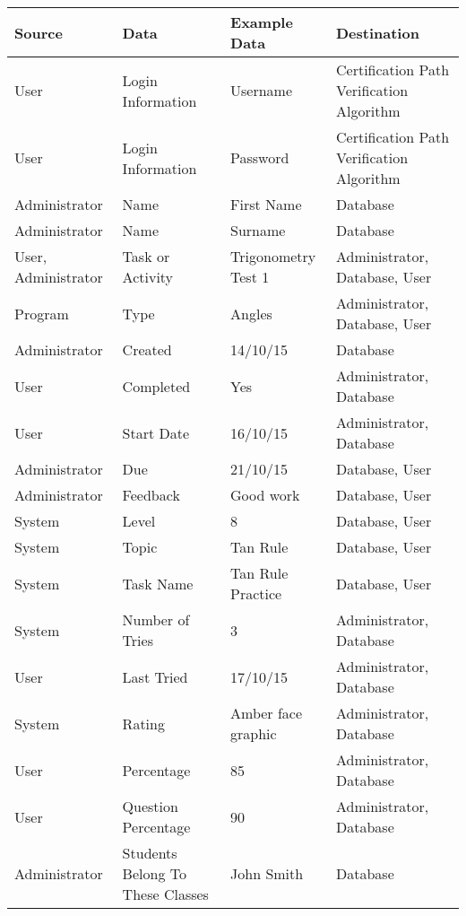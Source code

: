 \begin{center}
	\begin{tabular}{|p{3cm}|p{3cm}|p{3cm}|p{3cm}|}
		\hline
		\textbf{Source} & \textbf{Data} & \textbf{Example Data} & \textbf{Destination} \\ \hline
		User & Login Information & Username & Certification Path Verification Algorithm \\ \hline
		User & Login Information & Password & Certification Path Verification Algorithm \\ \hline
		Administrator & Name & First Name & Database \\ \hline
		Administrator & Name & Surname & Database \\ \hline
		User, Administrator & Task or Activity & Trigonometry Test 1 & Administrator, Database, User \\ \hline
		Program & Type & Angles & Administrator, Database, User \\ \hline
		Administrator & Created & 14/10/15 & Database \\ \hline
		User & Completed & Yes & Administrator, Database \\ \hline
		User & Start Date & 16/10/15 & Administrator, Database \\ \hline
		Administrator & Due & 21/10/15 & Database, User \\ \hline
		Administrator & Feedback & Good work & Database, User \\ \hline
		System & Level & 8 & Database, User \\ \hline
		System & Topic & Tan Rule & Database, User \\ \hline
		System & Task Name & Tan Rule Practice & Database, User \\ \hline
		System & Number of Tries & 3 &Administrator, Database \\ \hline
		User & Last Tried & 17/10/15 & Administrator, Database \\ \hline
		System & Rating & Amber face graphic & Administrator, Database \\ \hline
		User & Percentage & 85 & Administrator, Database \\ \hline
		User & Question Percentage & 90 & Administrator, Database \\ \hline
		Administrator & Students Belong To These Classes & John Smith & Database \\ \hline
	\end{tabular}
\end{center}

